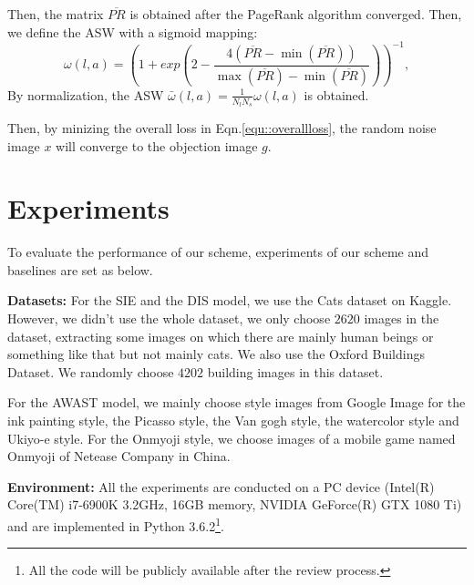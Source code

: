 \documentclass[10pt,twocolumn,letterpaper]{article}
\begin{document}
Then, the matrix $\overline{PR}$ is obtained after the PageRank algorithm converged. Then, we define the ASW with a sigmoid mapping:
\begin{equation}
\omega(l, a) = (1 + exp( 2 - \frac{4(\overline{PR} - \min(\overline{PR}))} {\max(\overline{PR})- \min(\overline{PR})}))^{-1},
\end{equation}
By normalization, the ASW $\bar{\omega}(l, a) = \frac{1}{N_lN_s}\omega(l, a)$ is obtained.

Then, by minizing the overall loss in Eqn.\ref{equ::overallloss}, the random noise image $x$ will converge to the objection image $g$.
%
%
%
%

\section{Experiments}
To evaluate the performance of our scheme, experiments of our scheme and baselines are set as below.

\textbf{Datasets:}\label{line::dataset}
For the SIE and the DIS model, we use the Cats dataset on Kaggle. However, we didn't use the whole dataset, we only choose $2620$ images in the dataset, extracting some images on which there are mainly human beings or something like that but not mainly cats. We also use the Oxford Buildings Dataset. We randomly choose $4202$ building images in this dataset.

For the AWAST model, we mainly choose style images from Google Image for the ink painting style, the Picasso style, the Van gogh style, the watercolor style and Ukiyo-e style. For the Onmyoji style, we choose images of a mobile game named Onmyoji of Netease Company in China.

\textbf{Environment:}
All the experiments are conducted on a PC device (Intel(R) Core(TM) i7-6900K 3.2GHz, 16GB memory, NVIDIA GeForce(R) GTX 1080 Ti) and are implemented in Python 3.6.2\footnote{All the code will be publicly available after the review process.}.
\end{document}
